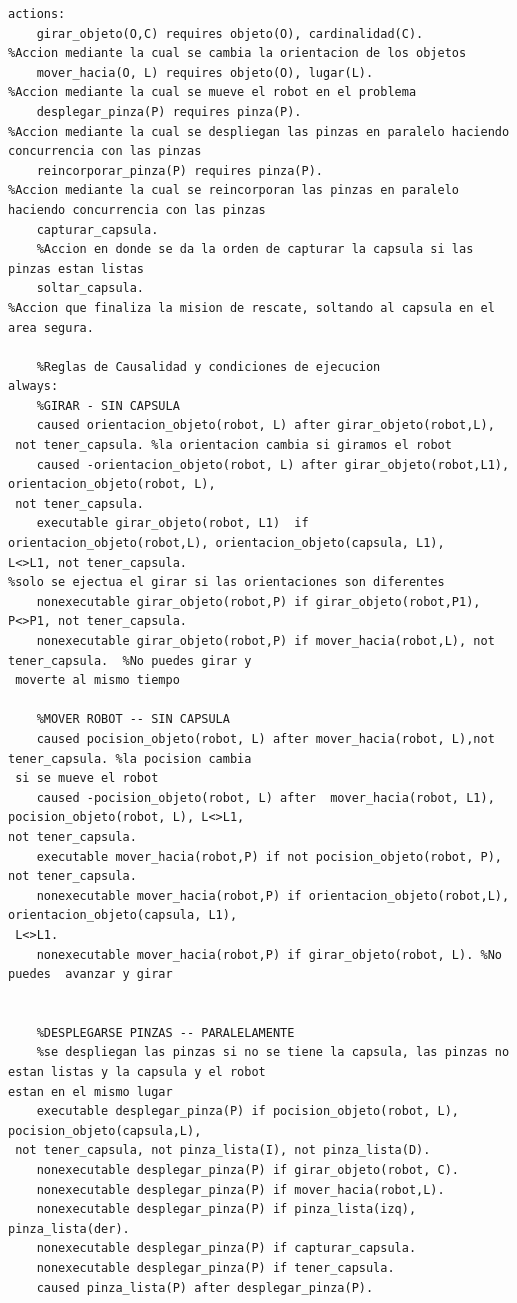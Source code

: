 \documentclass[letterpaper ,10pt]{article}
\begin{document}
{{{{{{\begin{lstlisting}
actions:
	girar_objeto(O,C) requires objeto(O), cardinalidad(C).			
%Accion mediante la cual se cambia la orientacion de los objetos
	mover_hacia(O, L) requires objeto(O), lugar(L).					
%Accion mediante la cual se mueve el robot en el problema
	desplegar_pinza(P) requires pinza(P).							
%Accion mediante la cual se despliegan las pinzas en paralelo haciendo concurrencia con las pinzas
	reincorporar_pinza(P) requires pinza(P).						
%Accion mediante la cual se reincorporan las pinzas en paralelo haciendo concurrencia con las pinzas
	capturar_capsula.											
	%Accion en donde se da la orden de capturar la capsula si las pinzas estan listas
	soltar_capsula.													
%Accion que finaliza la mision de rescate, soltando al capsula en el area segura.

	%Reglas de Causalidad y condiciones de ejecucion
always:
	%GIRAR - SIN CAPSULA
	caused orientacion_objeto(robot, L) after girar_objeto(robot,L),
 not tener_capsula. %la orientacion cambia si giramos el robot
	caused -orientacion_objeto(robot, L) after girar_objeto(robot,L1), orientacion_objeto(robot, L),
 not tener_capsula.
	executable girar_objeto(robot, L1)	if orientacion_objeto(robot,L), orientacion_objeto(capsula, L1),
L<>L1, not tener_capsula. 
%solo se ejectua el girar si las orientaciones son diferentes
	nonexecutable girar_objeto(robot,P) if girar_objeto(robot,P1), P<>P1, not tener_capsula.
	nonexecutable girar_objeto(robot,P) if mover_hacia(robot,L), not tener_capsula.  %No puedes girar y
 moverte al mismo tiempo
	
	%MOVER ROBOT -- SIN CAPSULA	
	caused pocision_objeto(robot, L) after mover_hacia(robot, L),not tener_capsula. %la pocision cambia
 si se mueve el robot
	caused -pocision_objeto(robot, L) after  mover_hacia(robot, L1), pocision_objeto(robot, L), L<>L1,
not tener_capsula.
	executable mover_hacia(robot,P) if not pocision_objeto(robot, P), not tener_capsula. 
	nonexecutable mover_hacia(robot,P) if orientacion_objeto(robot,L), orientacion_objeto(capsula, L1),
 L<>L1.
	nonexecutable mover_hacia(robot,P) if girar_objeto(robot, L). %No puedes  avanzar y girar

	
	%DESPLEGARSE PINZAS -- PARALELAMENTE
	%se despliegan las pinzas si no se tiene la capsula, las pinzas no estan listas y la capsula y el robot 
estan en el mismo lugar
	executable desplegar_pinza(P) if pocision_objeto(robot, L), pocision_objeto(capsula,L),
 not tener_capsula, not pinza_lista(I), not pinza_lista(D). 
	nonexecutable desplegar_pinza(P) if girar_objeto(robot, C).
	nonexecutable desplegar_pinza(P) if mover_hacia(robot,L).
	nonexecutable desplegar_pinza(P) if pinza_lista(izq), pinza_lista(der).
	nonexecutable desplegar_pinza(P) if capturar_capsula.
	nonexecutable desplegar_pinza(P) if tener_capsula.
	caused pinza_lista(P) after desplegar_pinza(P).
	

\end{lstlisting}}}}}}}
\end{document}
